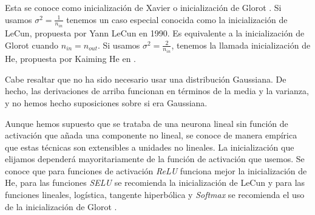 Esta se conoce como inicialización de Xavier o inicialización de Glorot \cite{stabilityProblem2}. Si usamos $\sigma^2= \frac{1}{n_{in}}$ tenemos un caso especial conocida como la inicialización de LeCun, propuesta por Yann LeCun en 1990. Es equivalente a la inicialización de Glorot cuando $n_{in}=n_{out}$. Si usamos $\sigma^2 = \frac{2}{n_{in}}$, tenemos la llamada inicialización de He, propuesta por Kaiming He en \cite{heinic}.


Cabe resaltar que no ha sido necesario usar una distribución Gaussiana. De hecho, las derivaciones de arriba funcionan en términos de la media y la varianza, y no hemos hecho suposiciones sobre si era Gaussiana. 


Aunque hemos supuesto que se trataba de una neurona lineal sin función de activación que añada una componente no lineal, se conoce de manera empírica que estas técnicas son extensibles a unidades no lineales. La inicialización que elijamos dependerá mayoritariamente de la función de activación que usemos. Se conoce que para funciones de activación \textit{ReLU} funciona mejor la inicialización de He, para las funciones \textit{SELU} se recomienda la inicialización de LeCun y para las funciones lineales, logística, tangente hiperbólica y \textit{Softmax} se recomienda el uso de la inicialización de Glorot \cite{murphy2022probabilistic}.